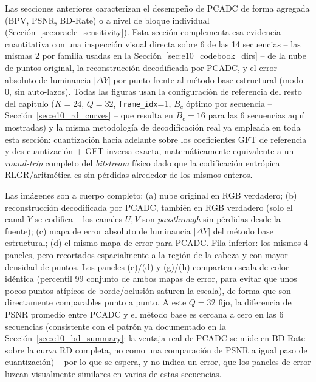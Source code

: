         Las secciones anteriores caracterizan el desempeño de PCADC de forma agregada (BPV,
        PSNR, BD-Rate) o a nivel de bloque individual (Sección~\ref{sec:oracle_sensitivity}).
        Esta sección complementa esa evidencia cuantitativa con una inspección visual directa
        sobre 6 de las 14 secuencias -- las mismas 2 por familia usadas en la Sección~\ref{sec:e10_codebook_dirs} -- de la nube de puntos original, la reconstrucción decodificada por PCADC, y
        el error absoluto de luminancia $|\Delta Y|$ por punto frente al método base estructural
        (modo 0, sin auto-lazos). Todas las figuras usan la configuración de referencia del
        resto del capítulo ($K=24$, $Q=32$, \texttt{frame\_idx}=1, $B_c$ óptimo por secuencia --
        Sección~\ref{sec:e10_rd_curves} -- que resulta en $B_c=16$ para las 6 secuencias aquí
        mostradas) y la misma metodología de decodificación real ya empleada en toda esta
        sección: cuantización hacia adelante sobre los coeficientes GFT de referencia y
        des-cuantización + GFT inversa exacta, matemáticamente
        equivalente a un \textit{round-trip} completo del \textit{bitstream} físico dado que la
        codificación entrópica RLGR/aritmética es sin pérdidas alrededor de los mismos enteros.

        Las imágenes son a cuerpo completo: (a) nube original en RGB verdadero; (b)
        reconstrucción decodificada por PCADC, también en RGB verdadero (solo el canal $Y$ se
        codifica -- los canales $U,V$ son \textit{passthrough} sin pérdidas desde la fuente); (c)
        mapa de error absoluto de luminancia $|\Delta Y|$ del método base estructural; (d) el
        mismo mapa de error para PCADC. Fila inferior: los mismos 4 paneles, pero recortados
        espacialmente a la región de la cabeza y con mayor densidad de puntos. Los paneles (c)/(d) y (g)/(h) comparten escala de color idéntica (percentil
        99 conjunto de ambos mapas de error, para evitar que unos pocos puntos atípicos de
        borde/oclusión saturen la escala), de forma que son directamente comparables punto a
        punto. A este $Q=32$ fijo, la diferencia de PSNR promedio entre PCADC y el método base es
        cercana a cero en las 6 secuencias (consistente con el patrón ya documentado en la
        Sección~\ref{sec:e10_bd_summary}: la ventaja real de PCADC se mide en BD-Rate sobre la
        curva RD completa, no como una comparación de PSNR a igual paso de cuantización) -- por
        lo que se espera, y no indica un error, que los paneles de error luzcan visualmente
        similares en varias de estas secuencias.

